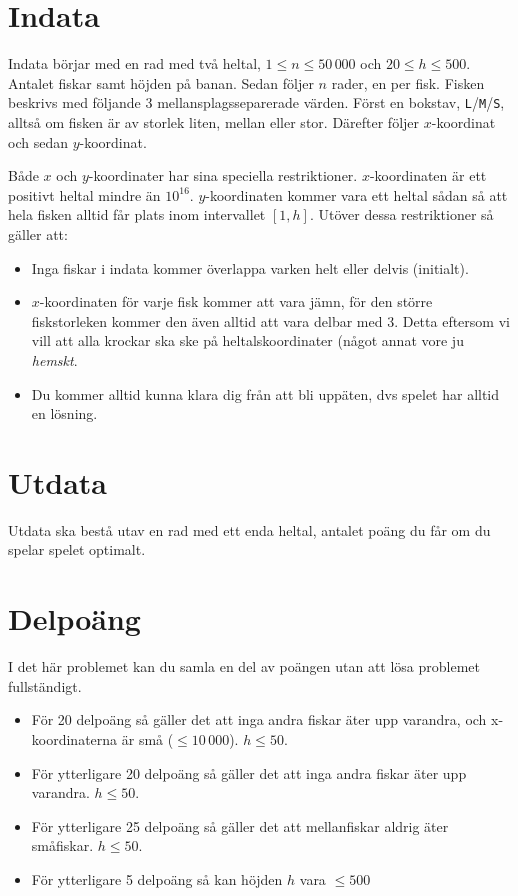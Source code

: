 \section*{Indata}

Indata börjar med en rad med två heltal, $1 \leq n \leq 50\,000$ och $20 \leq
h \leq 500$. Antalet fiskar samt höjden på banan. Sedan följer $n$ rader,
en per fisk. Fisken beskrivs med följande 3 mellansplagsseparerade värden.
Först en bokstav, \texttt{L}/\texttt{M}/\texttt{S}, alltså om fisken är av
storlek liten, mellan eller stor. Därefter följer $x$-koordinat och sedan
$y$-koordinat.

Både $x$ och $y$-koordinater har sina speciella restriktioner. $x$-koordinaten
är ett positivt heltal mindre än $10^{16}$. $y$-koordinaten kommer vara ett
heltal sådan så att hela fisken alltid får plats inom intervallet $[1, h]$.
Utöver dessa restriktioner så gäller att:

\begin{itemize}
  \item
    Inga fiskar i indata kommer överlappa varken helt eller delvis (initialt).
  \item
      $x$-koordinaten för varje fisk kommer att vara jämn, för den större
      fiskstorleken kommer den även alltid att vara delbar med 3. Detta
      eftersom vi vill att alla krockar ska ske på heltalskoordinater (något
      annat vore ju \emph{hemskt}.
  \item
    Du kommer alltid kunna klara dig från att bli uppäten, dvs spelet har
    alltid en lösning.
\end{itemize}

\section*{Utdata}
Utdata ska bestå utav en rad med ett enda heltal, antalet poäng du får om du spelar spelet optimalt.

\section*{Delpoäng}
I det här problemet kan du samla en del av poängen utan att lösa problemet fullständigt.

\begin{itemize}
    \item För 20 delpoäng så gäller det att inga andra fiskar äter upp
          varandra, och x-koordinaterna är små ($\leq 10\,000$). $h \leq 50$.
    \item För ytterligare 20 delpoäng så gäller det att inga andra fiskar
          äter upp varandra. $h \leq 50$.
    \item För ytterligare 25 delpoäng så gäller det att mellanfiskar aldrig
          äter småfiskar. $h \leq 50$.
    \item För ytterligare 5 delpoäng så kan höjden $h$ vara $\leq 500$
\end{itemize}
